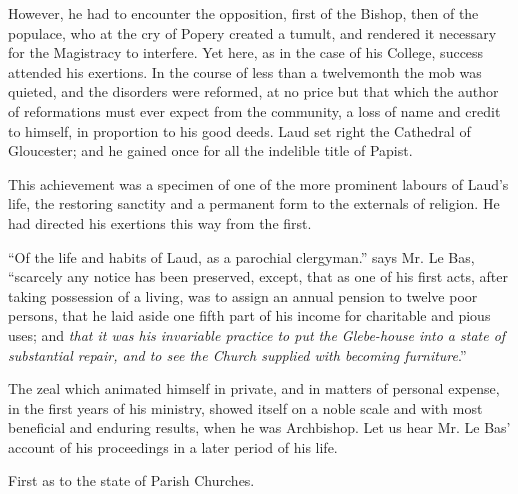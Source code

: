 However, he had to encounter the opposition, first
of the Bishop, then of the populace, who at the cry of Popery created a
tumult, and rendered it necessary for the Magistracy to interfere. Yet
here, as in the case of his College, success attended his exertions. In
the course of less than a twelvemonth the mob was quieted, and the
disorders were reformed, at no price but that which the author of
reformations must ever expect from the community, a loss of name and
credit to himself, in proportion to his good deeds. Laud set right the
Cathedral of Gloucester; and he gained once for all the indelible title
of Papist.

This achievement was a specimen of one of the more
prominent labours of Laud's life, the restoring sanctity and a permanent
form to the externals of religion. He had directed his exertions this
way from the first.

``Of the life and habits of Laud, as
a parochial clergyman.'' says Mr. Le Bas, ``scarcely any notice has been
preserved, except, that as one of his first acts, after taking
possession of a living, was to assign an annual pension to twelve poor
persons, that he laid aside one fifth part of his income for charitable
and pious uses; and \emph{that it was his invariable practice to put the
Glebe-house into a state of substantial repair, and to see the Church
supplied with becoming furniture}.''

The zeal which animated himself in private, and in
matters of personal expense, in the first years of his ministry, showed
itself on a noble scale and with most beneficial and enduring results,
when he was Archbishop. Let us hear Mr. Le Bas' account of his
proceedings in a later period of his life.

First as to the state of Parish Churches.

